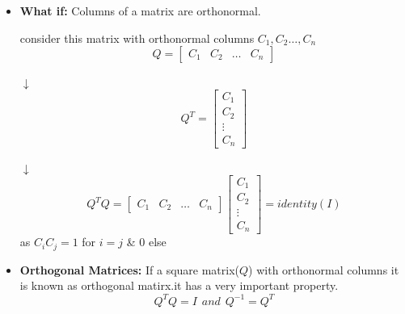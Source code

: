\documentclass[a4paper,11pt]{article}
\numberwithin{equation}{section}
\begin{document}
\begin{itemize}
\item \textbf{What if: }Columns of a matrix are orthonormal.
\begin{center}
    consider this matrix with orthonormal columns $C_1,C_2\dots,C_n$
    \[Q=
    \begin{bmatrix}
        C_1&C_2&\dots&C_n  
    \end{bmatrix}
    \]\\
    $\downarrow$
    \[Q^T=
        \begin{bmatrix}
            C_1\\C_2\\ \vdots\\C_n
        \end{bmatrix}
    \]\\
    $\downarrow$
    \[Q^TQ=
        \begin{bmatrix}
            C_1&C_2&\dots&C_n  
        \end{bmatrix}
        \begin{bmatrix}
            C_1\\C_2\\ \vdots\\C_n
        \end{bmatrix}=identity(I)
    \]
    as\hspace{4pt}  $C_iC_j=1$ for $i=j$ \& $0$ else
\end{center}

\item \textbf{Orthogonal Matrices: }If a square matrix($Q$) with orthonormal columns it is known as orthogonal matirx.it has a very important property.
\begin{equation}
    Q^TQ=I \hspace{5pt} and \hspace{5pt} Q^{-1}=Q^T
\end{equation}


\end{itemize}
\end{document}
